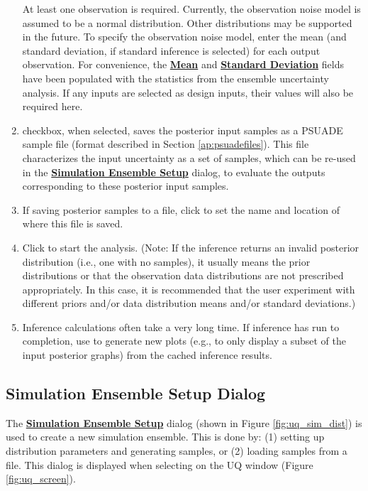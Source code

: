 \begin{enumerate}
   At least one observation is required.
   Currently, the	observation noise model is assumed to be a normal
	distribution. Other distributions may be supported in the future. To
	specify the observation noise model, enter the mean (and standard
	deviation, if standard inference is selected) for each output observation. For
	convenience, the \textbf{\underline{Mean}} and \textbf{\underline{Standard Deviation}} fields have been populated
	with the statistics from the ensemble uncertainty analysis. If any inputs
   are selected as design inputs, their values will also be required here.
\item
	 checkbox, when selected, saves the
	posterior input samples as a PSUADE sample file	(format described in
	Section \ref{ap:psuadefiles}). This file characterizes the input
	uncertainty as a set of samples, which can be re-used in the \textbf{\underline{Simulation Ensemble
	Setup}} dialog, to evaluate the outputs corresponding to these posterior
	input samples.
\item
	If saving posterior samples to a file, click  to set the
	name and location of where this file is saved.
\item
	Click  to start the analysis. (Note: If the inference returns
	an invalid posterior distribution (i.e., one with no samples), it
	usually means the prior distributions or that the observation data
	distributions are not prescribed appropriately. In this case, it is
	recommended that the user experiment with different priors and/or data
	distribution means and/or standard deviations.)
\item{Inference calculations often take a very long time. If inference has
	run to completion, use  to generate new plots (e.g., to only
	display a subset of the input posterior graphs) from the cached
	inference results.}
\end{enumerate}

\subsection{Simulation Ensemble Setup Dialog}
\label{subsec:uq_simsetup}

The \textbf{\underline{Simulation Ensemble Setup}} dialog (shown in Figure \ref{fig:uq_sim_dist}) is used
to create a new simulation ensemble. This is done by: (1) setting up
distribution parameters and generating samples, or (2) loading samples from
a file. This dialog is displayed when selecting  on the UQ
window (Figure \ref{fig:uq_screen}).

